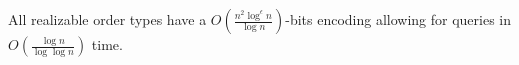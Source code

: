 \begin{contribution}[label=thm:realizable-loglog,restate=TheoremGPTRealizableLogLog]
  All realizable order types have
  a \(O(\frac{n^2 \log^\epsilon n}{\log n})\)-bits encoding
  allowing for queries in \(O(\frac{\log n}{\log \log n})\) time.
\end{contribution}
